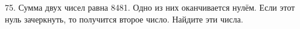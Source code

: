 75. Сумма двух чисел равна 8481. Одно из них оканчивается нулём. Если этот нуль зачеркнуть, то получится второе число. Найдите эти числа.\\
